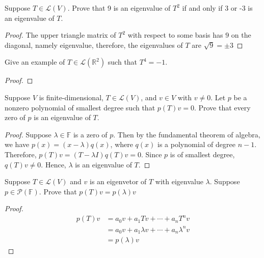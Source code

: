 \begin{exercise}
Suppose $T \in \mathcal{L}(V)$. Prove that 9 is an eigenvalue of $T^{2}$ if and only if 3 or -3 is an
eigenvalue of $T$.
\end{exercise}
\begin{proof}
	The upper triangle matrix of $T^{2}$ with respect to
	some basis has $9$ on the diagonal, namely eigenvalue,
	therefore, the eigenvalues of $T$ are $\sqrt{9} = \pm 3$
\end{proof}

\begin{exercise}
Give an example of $T \in \mathcal{L}(\mathbb{R}^{2})$
such that $T^{4} = -1$.
\end{exercise}
\begin{proof}
	\begin{comment}
	TODO: 5.B.8 Pending. Give an example.
	\end{comment}
\end{proof}

\newpage
\begin{exercise}
Suppose $V$ is finite-dimensional, $T \in \mathcal{L}(V)$, and $v \in V$ with $v \neq  0$. Let $p$ be a nonzero polynomial of smallest degree such that $p(T)v = 0$. Prove that every zero of $p$ is an eigenvalue of $T$.
\end{exercise}
\begin{proof}
	Suppose $\lambda \in \mathbb{F}$ is a zero of $p$. Then by the fundamental theorem of algebra, we have $p(x) = (x - \lambda)q(x)$, where $q(x)$ is a polynomial of degree $n - 1$. Therefore, $p(T)v = (T - \lambda I)q(T)v = 0$. Since $p$ is of smallest degree, $q(T)v \neq 0$. Hence, $\lambda$ is an eigenvalue of $T$.
\end{proof}

\begin{exercise}
Suppose $T \in \mathcal{L}(V)$ and $v$ is an eigenvetor of $T$ with eigenvalue $\lambda$. Suppose $p \in \mathcal{P}(\mathbb{F})$. Prove that $p(T)v = p(\lambda)v$
\end{exercise}
\begin{proof}
	\begin{equation*}
		\begin{aligned}
			p(T)v & = a_0v + a_1Tv + \cdots + a_nT^{n}v              \\
			      & = a_0v + a_1\lambda v + \cdots + a_n\lambda^{n}v \\
			      & = p(\lambda)v
		\end{aligned}
	\end{equation*}
\end{proof}

